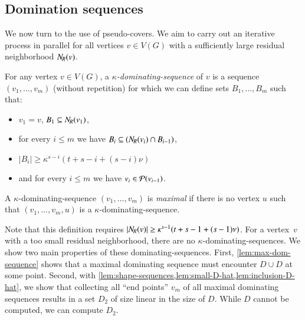 
\subsection{Domination sequences}

We now turn to the use of pseudo-covers.
%
We aim to carry out an iterative process in parallel
for all vertices \mbox{$v\in V(G)$} with a sufficiently large
residual neighborhood $N_{\hspace{-1pt}R}(v)$.

\begin{definition}\label{def:dom-sequence}
  For any vertex $v\in V(G)$, a {\em $\kappa$-dominating-sequence} of $v$ is a
  sequence $(v_1,\ldots,v_m)$ (without repetition) for which we can define
  sets $B_1,\ldots,B_m$ such that:
  \begin{itemize}
    \item $v_1=v$, $B_1 \subseteq N_{\hspace{-1pt}R}(v_1)$,
    \item for every $i\le m$ we have $B_{i} \subseteq (N_{\hspace{-1pt}R}(v_{i})\cap B_{i-1})$,
    \item $|B_{i}|\geq \kappa^{s -i}(t+s -i+(s -i)\nu)$
    \item and for every $i\le m$ we have $v_i\in \mathcal{P}(v_{i-1})$.
  \end{itemize}
  A $\kappa$-dominating-sequence $(v_1,\ldots,v_m)$ is {\em maximal} if there is no
  vertex $u$ such that $(v_1,\ldots,v_m,u)$ is a $\kappa$-dominating-sequence.
\end{definition}

Note that this definition requires $|N_{\hspace{-1pt}R}(v)|\ge \kappa^{s -1}(t+s -1+(s -1)\nu)$.
For a vertex~$v$ with a too small residual neighborhood, there are no
$\kappa$-dominating-sequences.
We show two main properties of these dominating-sequences.
First, \cref{lem:max-dom-sequence} shows that a maximal dominating sequence must
encounter $D\cup\hat{D}$ at some point. Second, with \cref{lem:shape-sequences,lem:small-D-hat,lem:inclusion-D-hat},
we show that collecting all ``end points'' $v_m$ of all maximal dominating
sequences results in a set $D_2$ of size linear in the size of $D$. While $D$
cannot be computed, we can compute $D_2$.




